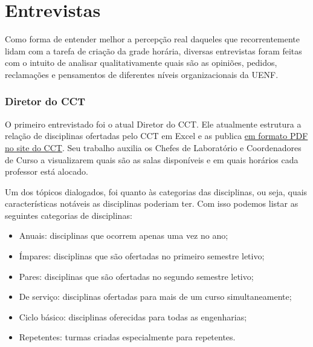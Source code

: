 \section{Entrevistas} %


    Como forma de entender melhor a percepção real daqueles que recorrentemente lidam com a tarefa de criação da grade horária, diversas entrevistas foram feitas com o intuito de analisar qualitativamente quais são as opiniões, pedidos, reclamações e pensamentos de diferentes níveis organizacionais da UENF.

    \subsubsection{Diretor do CCT} %


        O primeiro entrevistado foi o atual Diretor do CCT. Ele atualmente estrutura a relação de disciplinas ofertadas pelo CCT em Excel e as publica \href{https://uenf.br/cct/secretaria-academica/distribuicao-das-salas-de-aula-do-cct/}{em formato PDF no site do CCT}. Seu trabalho auxilia os Chefes de Laboratório e Coordenadores de Curso a visualizarem quais são as salas disponíveis e em quais horários cada professor está alocado.

        Um dos tópicos dialogados, foi quanto às categorias das disciplinas, ou seja, quais características notáveis as disciplinas poderiam ter. Com isso podemos listar as seguintes categorias de disciplinas:

        \begin{itemize}
            \item Anuais: disciplinas que ocorrem apenas uma vez no ano;
            \item Ímpares: disciplinas que são ofertadas no primeiro semestre letivo;
            \item Pares: disciplinas que são ofertadas no segundo semestre letivo;
            \item De serviço: disciplinas ofertadas para mais de um curso simultaneamente;
            \item Ciclo básico: disciplinas oferecidas para todas as engenharias;
            \item Repetentes: turmas criadas especialmente para repetentes.
        \end{itemize}

